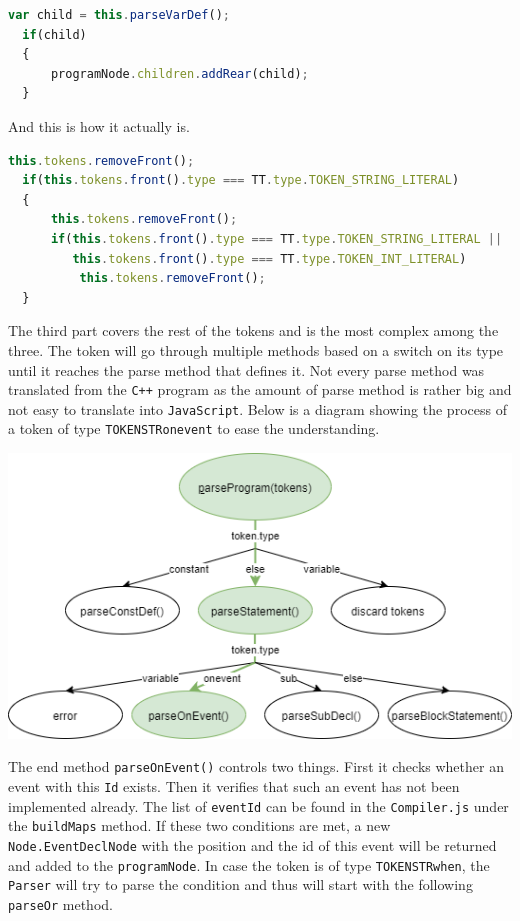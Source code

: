 \documentclass{scrreprt}
\begin{document}
\begin{lstlisting}[language=JavaScript, gobble=2, basicstyle=\ttfamily\small]
  var child = this.parseVarDef();
  if(child)
  {
      programNode.children.addRear(child);
  }
\end{lstlisting}

And this is how it actually is.

\begin{lstlisting}[language=JavaScript, gobble=2, basicstyle=\ttfamily\small]
  this.tokens.removeFront();
  if(this.tokens.front().type === TT.type.TOKEN_STRING_LITERAL)
  {
      this.tokens.removeFront();
      if(this.tokens.front().type === TT.type.TOKEN_STRING_LITERAL ||
         this.tokens.front().type === TT.type.TOKEN_INT_LITERAL)
          this.tokens.removeFront();
  }
\end{lstlisting}

The third part covers the rest of the tokens and is the most complex among the three. The token will go through multiple methods based on a switch on its type until it reaches the parse method that defines it. 
Not every parse method was translated from the \texttt{C++} program as the amount of parse method is rather big and not easy to translate into \texttt{JavaScript}. Below is a diagram showing the process of a token of type \texttt{TOKEN\textunderscore STR\textunderscore onevent} to ease the understanding.

\begin{center}
  \includegraphics[width=\textwidth]{./event_when}
\end{center}

The end method \texttt{parseOnEvent()} controls two things. First it checks whether an event with this \texttt{Id} exists. Then it verifies that such an event has not been implemented already. The list of \texttt{eventId} can be found in the \texttt{Compiler.js} under the \texttt{buildMaps} method.
If these two conditions are met, a new \texttt{Node.EventDeclNode} with the position and the id of this event will be returned and added to the \texttt{programNode}. 
In case the token is of type \texttt{TOKEN\textunderscore STR\textunderscore when}, the \texttt{Parser} will try to parse the condition and thus will start with the following \texttt{parseOr} method.
\end{document}
